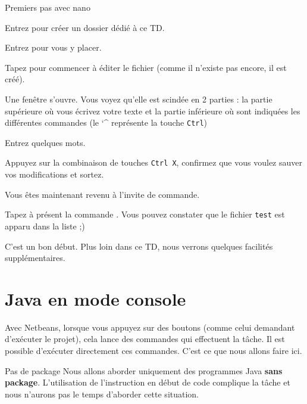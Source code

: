 \documentclass[a4paper,11pt]{style-esi/td}
\begin{document}
	\begin{Tutoriel}{Premiers pas avec nano}
	\vspace{-1em}
	\begin{steps}
	\item 
		Entrez  pour créer un dossier dédié à ce TD.
	\item 
		Entrez  pour vous y placer.
	\item 
		Tapez  pour commencer à éditer le fichier  
		(comme il n'existe pas encore, il est créé).
	
		Une fenêtre s'ouvre. 
		Vous voyez qu'elle est scindée en 2 parties : 
		la partie supérieure où vous écrivez votre texte 
		et la partie inférieure où sont indiquées 
		les différentes commandes (le \char`\^{} représente la touche \verb|Ctrl|)
	\item 
		Entrez quelques mots.
	\item 
		Appuyez sur la combinaison de touches \verb|Ctrl X|, 
		confirmez que vous voulez sauver vos modifications et sortez.
	
		Vous êtes maintenant revenu à l'invite de commande.
	\item 
		Tapez à présent la commande .
		Vous pouvez constater que le fichier \verb_test_ est apparu dans la liste ;)
	\end{steps}
	\end{Tutoriel}

	C'est un bon début.
	Plus loin dans ce TD, nous verrons quelques facilités supplémentaires.

\section{Java en mode console}

	Avec Netbeans, lorsque vous appuyez sur des boutons
	(comme celui demandant d'exécuter le projet),
	cela lance des commandes qui effectuent la tâche.
	Il est possible d'exécuter directement ces commandes.
	C'est ce que nous allons faire ici.

	\begin{alerttbox}{Pas de package}
		Nous allons aborder uniquement des programmes Java
		\textbf{sans package}.
		L'utilisation de l'instruction  en début de code
		complique la tâche et nous n'aurons pas le temps d'aborder cette situation.
	\end{alerttbox}
\end{document}
